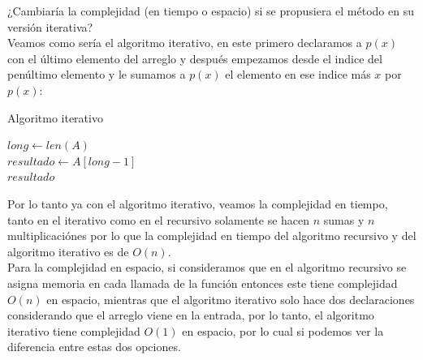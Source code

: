 \documentclass[12pt]{article}
\begin{document}
\begin{itemize}
    ¿Cambiaría la complejidad (en tiempo o espacio) si se propusiera el método en su versión iterativa?\\
    Veamos como sería el algoritmo iterativo, en este primero declaramos a $p(x)$ con el último elemento del arreglo y después empezamos desde el indice del penúltimo elemento y le sumamos a $p(x)$ el elemento en ese indice más $x$ por $p(x)$:\\
    \begin{algorithm}[H]
        \caption{Algoritmo iterativo}
        $long \gets len(A)$\\
        $resultado \gets A[long - 1]$\\
        \Return $resultado$
    \end{algorithm}
    Por lo tanto ya con el algoritmo iterativo, veamos la complejidad en tiempo, tanto en el iterativo como en el recursivo solamente se hacen $n$ sumas y $n$ multiplicaciónes por lo que la complejidad en tiempo del algoritmo recursivo y del algoritmo iterativo es de $O(n)$.\\
    Para la complejidad en espacio, si consideramos que en el algoritmo recursivo se asigna memoria en cada llamada de la función entonces este tiene complejidad $O(n)$ en espacio, mientras que el algoritmo iterativo solo hace dos declaraciones considerando que el arreglo viene en la entrada, por lo tanto, el algoritmo iterativo tiene complejidad $O(1)$ en espacio, por lo cual si podemos ver la diferencia entre estas dos opciones. 
\end{itemize}

\end{document}
